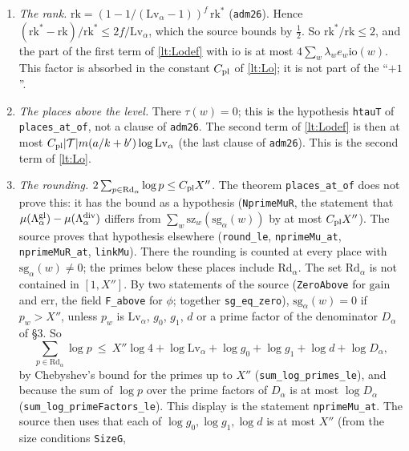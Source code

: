 \documentclass[11pt,letterpaper]{article}
\begin{document}
\begin{enumerate}[label=\textup{(\alph*)},leftmargin=2.4em,itemsep=1pt,topsep=2pt]
\item \emph{The rank.} $\mathrm{rk}=(1-1/(\mathrm{Lv}_\alpha-1))^f\,\mathrm{rk}^*$ (\texttt{adm26}). Hence
$(\mathrm{rk}^*-\mathrm{rk})/\mathrm{rk}^*\le2f/\mathrm{Lv}_\alpha$, which the source bounds by $\frac12$.
So $\mathrm{rk}^*/\mathrm{rk}\le2$, and the part of the first term of \eqref{lt:Lodef} with
$\mathrm{io}$ is at most $4\sum_w\lambda_we_w\mathrm{io}(w)$. This factor is absorbed in the constant $C_{\rm pl}$
of \eqref{lt:Lo}; it is not part of the ``$+1$''.
\item \emph{The places above the level.} There $\tau(w)=0$; this is the hypothesis \texttt{htauT} of
\texttt{places\_at\_of}, not a clause of \texttt{adm26}. The second term of \eqref{lt:Lodef} is then at
most $C_{\rm pl}|\mathcal T|m(a/k+b')\log\mathrm{Lv}_\alpha$ (the last clause of \texttt{adm26}). This is
the second term of \eqref{lt:Lo}.
\item \emph{The rounding.} $2\sum_{p\in\mathrm{Rd}_\alpha}\log p\le C_{\rm pl}X''$. The theorem
\texttt{places\_at\_of} does not prove this: it has the bound as a hypothesis (\texttt{NprimeMuR}, the
statement that $\mu(\Lambda^{\rm gl}_\alpha)-\mu(\Lambda^{\rm div}_\alpha)$ differs from
$\sum_w\mathrm{sz}_w(\mathrm{sg}_\alpha(w))$ by at most $C_{\rm pl}X''$). The source proves that hypothesis
elsewhere (\texttt{round\_le}, \texttt{nprimeMu\_at}, \texttt{nprimeMuR\_at}, \texttt{linkMu}). There the
rounding is counted at every place with $\mathrm{sg}_\alpha(w)\ne0$; the primes below these places include
$\mathrm{Rd}_\alpha$. The set $\mathrm{Rd}_\alpha$ is not contained in $[1,X'']$. By two statements of the
source (\texttt{ZeroAbove} for $\mathrm{gain}$ and $\mathrm{err}$, the field \texttt{F\_above} for $\phi$;
together \texttt{sg\_eq\_zero}), $\mathrm{sg}_\alpha(w)=0$ if
$p_w>X''$, unless $p_w$ is $\mathrm{Lv}_\alpha$, $g_0$, $g_1$, $d$ or a prime factor of the denominator
$D_\alpha$ of \S3. So
\begin{equation}\label{D:228}
 \sum_{p\in\mathrm{Rd}_\alpha}\log p\ \le\ X''\log4+\log\mathrm{Lv}_\alpha+\log g_0+\log g_1+\log d+\log D_\alpha ,
\end{equation}
by Chebyshev's bound for the primes up to $X''$ (\texttt{sum\_log\_primes\_le}), and because the sum of
$\log p$ over the prime factors of $D_\alpha$ is at most $\log D_\alpha$
(\texttt{sum\_log\_primeFactors\_le}). This display is the statement \texttt{nprimeMu\_at}. The source then
uses that each of $\log g_0,\log g_1,\log d$ is at most $X''$ (from the size conditions \texttt{SizeG},

\end{enumerate}
\end{document}
